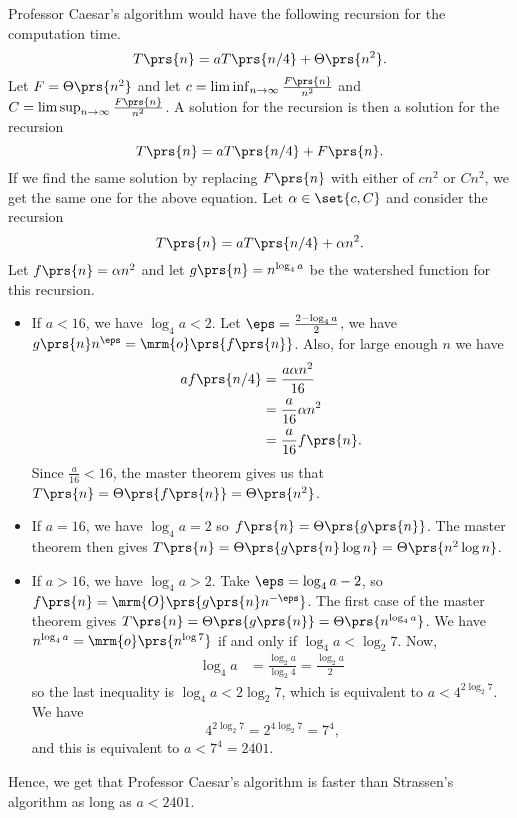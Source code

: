 \documentclass[oneside]{scrbook}
\theoremstyle{definition}
\begin{document}
\begin{exercise}
Professor Caesar's algorithm would have the following recursion for the computation time.
\[T\prs{n} = a T\prs{n/4} + \Theta\prs{n^2} \text{.}\]
Let $F = \Theta\prs{n^2}$ and let $c = \liminf_{n\to\infty} \frac{F\prs{n}}{n^2}$ and $C = \limsup_{n\to\infty} \frac{F\prs{n}}{n^2}$.
A solution for the recursion is then a solution for the recursion
\[T\prs{n} = a T\prs{n/4} + F\prs{n} \text{.}\]
If we find the same solution by replacing $F\prs{n}$ with either of $c n^2$ or $C n^2$, we get the same one for the above equation. Let $\alpha \in \set{c, C}$ and consider the recursion
\[T\prs{n} = a T\prs{n/4} + \alpha n^2 \text{.}\]
Let $f\prs{n} = \alpha n^2$ and let $g\prs{n} = n^{\log_4 a}$ be the watershed function for this recursion.
\begin{itemize}
\item If $a < 16$, we have $\log_4 a < 2$. Let $\eps = \frac{2 - \log_4 a}{2}$, we have $g\prs{n} n^\eps = \mrm{o}\prs{f\prs{n}}$. Also, for large enough $n$ we have
\begin{align*}
a f\prs{n/4}
&=
\frac{a \alpha n^2}{16}
\\&= \frac{a}{16} \alpha n^2
\\&= \frac{a}{16} f\prs{n} \text{.}
\end{align*}
Since $\frac{a}{16} < 16$, the master theorem gives us that $T\prs{n} = \Theta\prs{f\prs{n}} = \Theta\prs{n^2}$.

\item If $a = 16$, we have $\log_4 a = 2$ so $f\prs{n} = \Theta\prs{g\prs{n}}$. The master theorem then gives $T\prs{n} = \Theta\prs{g\prs{n} \log n} = \Theta\prs{n^2 \log n}$.

\item If $a > 16$, we have $\log_4 a > 2$. Take $\eps = \log_4 a - 2$, so $f\prs{n} = \mrm{O}\prs{g\prs{n} n^{-\eps}}$. The first case of the master theorem gives $T\prs{n} = \Theta\prs{g\prs{n}} = \Theta\prs{n^{\log_4 a}}$. We have $n^{\log_4 a} = \mrm{o}\prs{n^{\log 7}}$ if and only if $\log_4 a < \log_2 7$. Now,
\begin{align*}
\log_4 a &= \frac{\log_2 a}{\log_2 4} = \frac{\log_2 a}{2}
\end{align*}
so the last inequality is $\log_4 a < 2 \log_2 7$, which is equivalent to $a < 4^{2 \log_2 7}$.
We have
\[4^{2 \log_2 7} = 2^{4 \log_2 7} = 7^4 \text{,}\]
and this is equivalent to $a < 7^4 = 2401$.
\end{itemize}
Hence, we get that Professor Caesar's algorithm is faster than Strassen's algorithm as long as $a < 2401$.
\end{exercise}
\end{document}
